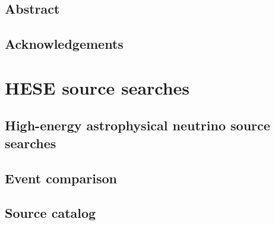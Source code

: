 \documentclass[oneside, letterpaper, 10pt, oldfontcommands]{memoir}
\begin{document}
\frontmatter

\thetitlepage
\cleardoublepage
\setcounter{page}{1}

\section{Abstract}
\uwabstract
\cleardoublepage

\section{Acknowledgements}


\clearpage
\tableofcontents\clearpage

\mainmatter












%

\printbibliography

\clearpage
\newpage
\appendix

\begingroup
\graphicspath{{results/HESE_Final_Paper/}}
\chapter{HESE source searches}
\section{High-energy astrophysical neutrino source searches\label{sec:sources}}

\section{Event comparison\label{sec:comparison}}

\section{Source catalog\label{sec:source_catalog}}

\end{document}
